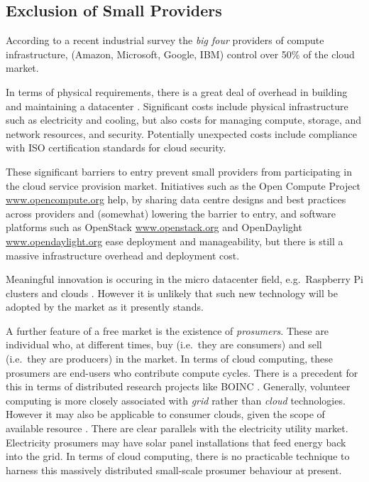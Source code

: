 \documentclass[conference,10pt]{IEEEtran}
\begin{document}

\subsection{Exclusion of Small Providers}

According to a recent industrial survey \cite{url3} the \emph{big four} providers of compute infrastructure, (Amazon, Microsoft, Google, IBM) control over 50\% of the cloud market. 

In terms of physical requirements, there is a great deal of overhead in building and maintaining a datacenter \cite{greenberg08cost}. Significant costs include physical infrastructure such as electricity and cooling, but also costs for managing compute, storage, and network resources, and security. Potentially unexpected costs include compliance with ISO certification standards for cloud security.

These significant barriers to entry prevent small providers from participating in the cloud service provision market. Initiatives such as the Open Compute Project \url{www.opencompute.org} help, by sharing data centre designs and best practices across providers and (somewhat) lowering the barrier to entry, and software platforms such as OpenStack \url{www.openstack.org} and OpenDaylight \url{www.opendaylight.org} ease deployment and manageability, but there is still a massive infrastructure overhead and deployment cost.

Meaningful innovation is occuring in the micro datacenter field, e.g.\ Raspberry Pi clusters \cite{cox14low} and clouds \cite{tso13glasgow,abrahamsson13affordable,valancius:2009:greening}.
However it is unlikely that such new technology will be adopted by the market as it presently stands.


A further feature of a free market is the existence of \emph{prosumers}. These are individual who, at different times,  buy (i.e.\ they are consumers) and sell (i.e.\ they are producers) in the market. In terms of cloud computing, these prosumers are end-users who contribute compute cycles. There is a precedent for this in terms of distributed research projects like BOINC \cite{anderson04boinc}.
Generally, volunteer computing is more closely associated with \emph{grid} rather than \emph{cloud} technologies. However it may also be applicable to consumer clouds, given the scope of available resource \cite{anderson06computational}. There are clear parallels with the electricity utility market. Electricity prosumers may have solar panel installations that feed energy back into the grid. In terms of cloud computing, there is no practicable technique to harness this massively distributed small-scale prosumer behaviour at present.
\end{document}

